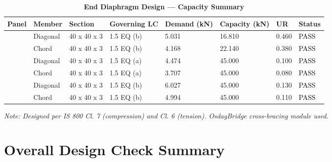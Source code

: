 \documentclass[12pt,a4paper]{report}
\numberwithin{table}{chapter}
\numberwithin{figure}{chapter}
\begin{document}
\vspace{1em}

\begin{longtable}{|C{2.0cm}|L{1.8cm}|C{2.2cm}|C{3.0cm}|C{1.8cm}|C{1.8cm}|C{1.2cm}|C{1.8cm}|}
\caption{\textbf{End Diaphragm Design --- Capacity Summary}}
\hline
\textbf{Panel} & \textbf{Member} & \textbf{Section} & \textbf{Governing LC} & \textbf{Demand (kN)} & \textbf{Capacity (kN)} & \textbf{UR} & \textbf{Status} \\[6pt]
\hline
{} & Diagonal & 40 x 40 x 3 & 1.5 EQ (b) & 5.031 & 16.810 & 0.460 & \textcolor{black}{PASS} \\[6pt]
 & Chord & 40 x 40 x 3 & 1.5 EQ (b) & 4.168 & 22.140 & 0.380 & \textcolor{black}{PASS} \\[6pt]
\hline
{} & Diagonal & 40 x 40 x 3 & 1.5 EQ (a) & 4.474 & 45.000 & 0.100 & \textcolor{black}{PASS} \\[6pt]
 & Chord & 40 x 40 x 3 & 1.5 EQ (a) & 3.707 & 45.000 & 0.080 & \textcolor{black}{PASS} \\[6pt]
\hline
{} & Diagonal & 40 x 40 x 3 & 1.5 EQ (b) & 6.027 & 45.000 & 0.130 & \textcolor{black}{PASS} \\[6pt]
 & Chord & 40 x 40 x 3 & 1.5 EQ (b) & 4.994 & 45.000 & 0.110 & \textcolor{black}{PASS} \\[6pt]
\hline
\end{longtable}
\noindent\textit{Note: Designed per IS 800 Cl. 7 (compression) and Cl. 6 (tension). OsdagBridge cross-bracing module used.}

\section{Overall Design Check Summary}
\label{sec:overall-summary}
\end{document}
